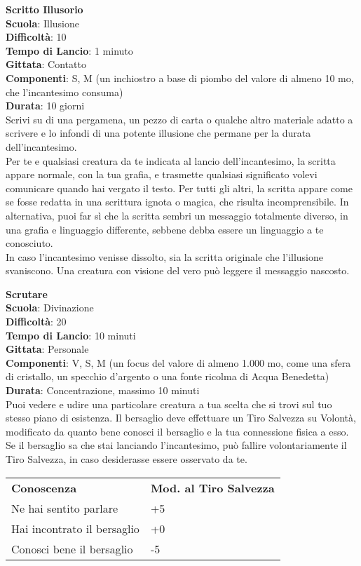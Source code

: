 \begin{multicols}{2}
\medskip\textbf{Scritto Illusorio}\\
\textbf{Scuola}: Illusione\\
\textbf{Difficoltà}:  10\\
\textbf{Tempo di Lancio}: 1 minuto\\
\textbf{Gittata}: Contatto\\
\textbf{Componenti}: S, M (un inchiostro a base di piombo del valore di almeno 10 mo, che l'incantesimo consuma)\\
\textbf{Durata}: 10 giorni\\
Scrivi su di una pergamena, un pezzo di carta o qualche altro materiale adatto a scrivere e lo infondi di una potente illusione che permane per la durata dell'incantesimo.\\
Per te e qualsiasi creatura da te indicata al lancio dell'incantesimo, la scritta appare normale, con la tua grafia, e trasmette qualsiasi significato volevi comunicare quando hai vergato il testo. Per tutti gli altri, la scritta appare come se fosse redatta in una scrittura ignota o magica, che risulta incomprensibile. In alternativa, puoi far sì che la scritta sembri un messaggio totalmente diverso, in una grafia e linguaggio differente, sebbene debba essere un linguaggio a te conosciuto.\\
In caso l'incantesimo venisse dissolto, sia la scritta originale che l’illusione svaniscono. Una creatura con visione del vero può leggere il messaggio nascosto.

\medskip\textbf{Scrutare}\\
\textbf{Scuola}: Divinazione\\
\textbf{Difficoltà}:  20\\
\textbf{Tempo di Lancio}: 10 minuti\\
\textbf{Gittata}: Personale\\
\textbf{Componenti}: V, S, M (un focus del valore di almeno 1.000 mo, come una sfera di cristallo, un specchio d’argento o una fonte ricolma di Acqua Benedetta)\\
\textbf{Durata}: Concentrazione, massimo 10 minuti\\
Puoi vedere e udire una particolare creatura a tua scelta che si trovi sul tuo stesso piano di esistenza. Il bersaglio deve effettuare un Tiro Salvezza su Volontà, modificato da quanto bene conosci il bersaglio e la tua connessione fisica a esso. Se il bersaglio sa che stai lanciando l'incantesimo, può fallire volontariamente il Tiro Salvezza, in caso desiderasse essere osservato da
te.
\medskip
\begin{tabular}{ll}
\toprule
\textbf{Conoscenza} & \textbf{Mod. al Tiro Salvezza}\\
Ne hai sentito parlare &+5\\
Hai incontrato il bersaglio &+0\\
Conosci bene il bersaglio &-5\\
\end{tabular}


\end{multicols}

